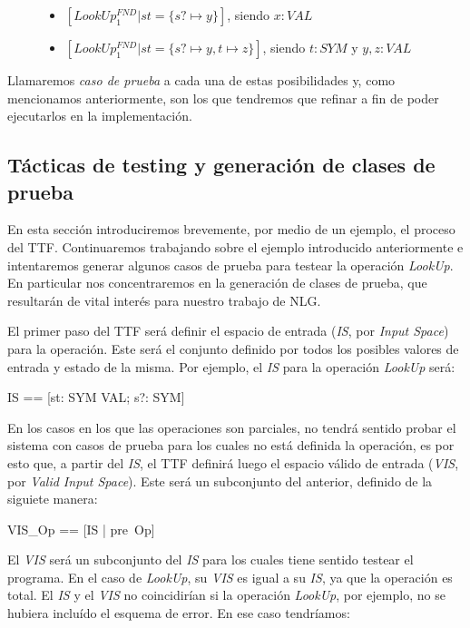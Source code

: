 \begin{figure}[H]
\begin{itemize}
\item $[LookUp_{1}^{FND}  | st = \{s? \mapsto y\}]$, siendo $x: VAL$ 
\item $[LookUp_{1}^{FND}  | st = \{s? \mapsto y, t \mapsto z\}]$, siendo $t: SYM$ y $y, z: VAL$
\end{itemize}
\end{figure}

Llamaremos \emph{caso de prueba} a cada una de estas posibilidades y, como mencionamos anteriormente, son los que tendremos que refinar a fin de poder ejecutarlos en la implementación.

\subsection{Tácticas de testing y generación de clases de prueba}
\label{sec:tacticas-testing}

En esta sección introduciremos brevemente, por medio de un ejemplo, el proceso del TTF. Continuaremos trabajando sobre el ejemplo introducido anteriormente e intentaremos generar algunos casos de prueba para testear la operación \emph{LookUp}. En particular nos concentraremos en la generación de clases de prueba, que resultarán de vital interés para nuestro trabajo de NLG.

El primer paso del TTF será definir el espacio de entrada (\emph{IS}, por \emph{Input Space}) para la operación. Este será el conjunto definido por todos los posibles valores de entrada y estado de la misma. Por ejemplo, el \emph{IS} para la operación \emph{LookUp} será:

\begin{zed}
  IS == [st: SYM \pfun VAL; s?: SYM]
\end{zed}

En los casos en los que las operaciones son parciales, no tendrá sentido probar el sistema con casos de prueba para los cuales no está definida la operación, es por esto que, a partir del \emph{IS}, el TTF definirá luego el espacio válido de entrada (\emph{VIS}, por \emph{Valid Input Space}). Este será un subconjunto del anterior, definido de la siguiete manera:

\begin{zed}
  VIS_{Op} == [IS | pre~Op]
\end{zed}

El \emph{VIS} será un subconjunto del \emph{IS} para los cuales tiene sentido testear el programa. En el caso de \emph{LookUp}, su \emph{VIS} es igual a su \emph{IS}, ya que la operación es total. El \emph{IS} y el \emph{VIS} no coincidirían si la operación \emph{LookUp}, por ejemplo, no se hubiera incluído el esquema de error. En ese caso tendríamos:

